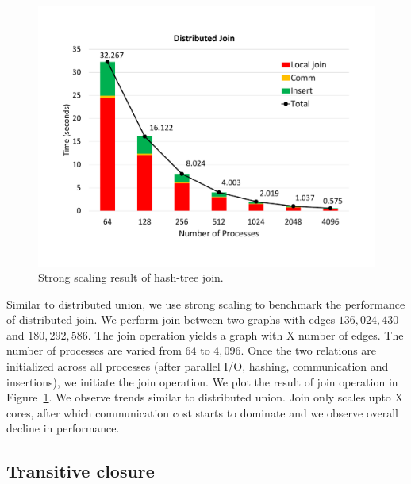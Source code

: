 \begin{figure}[h]
	\includegraphics[width=\columnwidth]{results/join.pdf}
	\caption{Strong scaling result of hash-tree join.}
	\label{fig:dist_join}
\end{figure}



Similar to distributed union, we use strong scaling to benchmark the performance of distributed join.
We perform join between two graphs with edges $136,024,430$ and $180,292,586$. The join operation yields a graph with X number of edges.
The number of processes are varied from $64$ to $4,096$. 
Once the two relations are initialized across all processes (after parallel I/O, hashing, communication and insertions), we initiate the join operation. 
We plot the result of join operation in Figure~\ref{fig:dist_join}. We observe trends similar to distributed union.
Join only scales upto X cores, after which communication cost starts to dominate and we observe overall decline in performance.


\subsection{Transitive closure}
\label{sec:tc}

